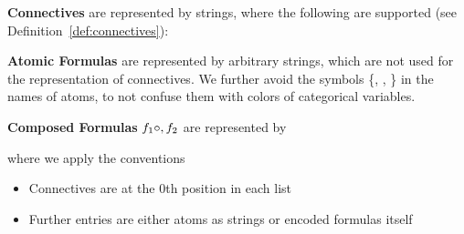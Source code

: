 \textbf{Connectives} are represented by strings, where the following are supported (see Definition~\ref{def:connectives}):
\begin{center}
\end{center}

\textbf{Atomic Formulas} are represented by arbitrary strings, which are not used for the representation of connectives. 
We further avoid the symbols \{\stringof{(}, \stringof{)}, \stringof{\_}\} in the names of atoms, to not confuse them with colors of categorical variables.

\textbf{Composed Formulas} $f_1\circ,f_2$ are represented by 
\begin{centeredcode}
\end{centeredcode}
where we apply the conventions
\begin{itemize}
	\item Connectives are at the 0th position in each list
	\item Further entries are either atoms as strings or encoded formulas itself
\end{itemize}

